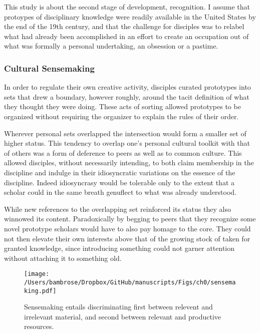 \documentclass[]{article}
\begin{document}


This study is about the second stage of development, recognition. I
assume that protoypes of disciplinary knowledge were readily available
in the United States by the end of the 19th century, and that the
challenge for disciples was to relabel what had already been
accomplished in an effort to create an occupation out of what was
formally a personal undertaking, an obsession or a pastime.

\subsubsection{Cultural Sensemaking}\label{cultural-sensemaking}

In order to regulate their own creative activity, disciples curated
prototypes into sets that drew a boundary, however roughly, around the
tacit definition of what they thought they were doing. These acts of
sorting allowed prototypes to be organized without requiring the
organizer to explain the rules of their order.

Wherever personal sets overlapped the intersection would form a smaller
set of higher status. This tendency to overlap one's personal cultural
toolkit with that of others was a form of deference to peers as well as
to common culture. This allowed disciples, without necessarily
intending, to both claim membership in the discipline and indulge in
their idiosyncratic variations on the essence of the discipline. Indeed
idiosyncrasy would be tolerable only to the extent that a scholar could
in the same breath genuflect to what was already understood.

While new references to the overlapping set reinforced its status they
also winnowed its content. Paradoxically by begging to peers that they
recognize some novel prototype scholars would have to also pay homage to
the core. They could not then elevate their own interests above that of
the growing stock of taken for granted knowledge, since introducing
something could not garner attention without attaching it to something
old.

\begin{figure}[htbp]
\centering
\texttt{[image: /Users/bambrose/Dropbox/GitHub/manuscripts/Figs/ch0/sensemaking.pdf]}
\caption{Sensemaking entails discriminating first between relevent and
irrelevant material, and second between relevant and productive
resources.}
\end{figure}
\end{document}

